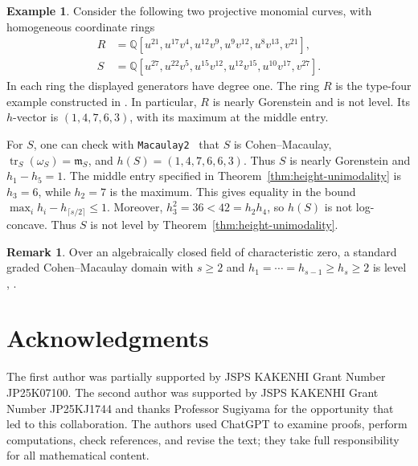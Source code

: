 \documentclass[a4paper,11pt]{amsart}
\DeclareMathOperator{\tr}{tr}
\newcommand{\QQ}{\mathbb{Q}}
\newcommand{\m}{\mathfrak{m}}
\theoremstyle{definition}
\newtheorem{example}[theorem]{Example}
\newtheorem{remark}[theorem]{Remark}
\begin{document}
\begin{example}\label{ex:middle-gap}
Consider the following two projective monomial curves, with homogeneous coordinate rings
\[
\begin{aligned}
 R&=\QQ[u^{21},u^{17}v^4,u^{12}v^9,u^9v^{12},u^8v^{13},v^{21}],\\
 S&=\QQ[u^{27},u^{22}v^5,u^{15}v^{12},u^{12}v^{15},u^{10}v^{17},v^{27}].
\end{aligned}
\]
In each ring the displayed generators have degree one. The ring $R$ is the type-four example constructed in \cite[proof of Theorem~3.11, case $d=4$]{M24}. In particular, $R$ is nearly Gorenstein and is not level. Its $h$-vector is $(1,4,7,6,3)$, with its maximum at the middle entry.

For $S$, one can check with \texttt{Macaulay2}~\cite{M2} that $S$ is Cohen--Macaulay, $\tr_S(\omega_S)=\m_S$, and $h(S)=(1,4,7,6,6,3)$. Thus $S$ is nearly Gorenstein and $h_1-h_5=1$. The middle entry specified in Theorem~\ref{thm:height-unimodality} is $h_3=6$, while $h_2=7$ is the maximum. This gives equality in the bound $\max_i h_i-h_{\lceil s/2\rceil}\le1$. Moreover, $h_3^2=36<42=h_2h_4$, so $h(S)$ is not log-concave. Thus $S$ is not level by Theorem~\ref{thm:height-unimodality}.
\end{example}

\begin{remark}\label{rem:yanagawa}
Over an algebraically closed field of characteristic zero, a standard graded Cohen--Macaulay domain with $s\geq2$ and $h_1=\cdots=h_{s-1}\geq h_s\geq2$ is level \cite[Corollary~3.11]{Y95}, \cite[Lemma~5~(2) and Proposition~6]{Y97}.
\end{remark}

\section*{Acknowledgments}
The first author was partially supported by JSPS KAKENHI Grant Number JP25K07100. The second author was supported by JSPS KAKENHI Grant Number JP25KJ1744 and thanks Professor Sugiyama for the opportunity that led to this collaboration. The authors used ChatGPT to examine proofs, perform computations, check references, and revise the text; they take full responsibility for all mathematical content.\par
\end{document}
